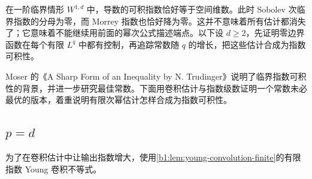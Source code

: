
在一阶临界情形 \(W^{1,d}\) 中，导数的可积指数恰好等于空间维数。此时 Sobolev 次临界指数的分母为零，而 Morrey 指数也恰好降为零。这并不意味着所有估计都消失了；它意味着不能继续用前面的幂次公式描述端点。以下设 \(d\ge2\)，先证明零边界函数在每个有限 \(L^q\) 中都有控制，再追踪常数随 \(q\) 的增长，把这些估计合成为指数可积性。

\ProseParagraphBreak

Moser 的《A Sharp Form of an Inequality by N. Trudinger》\cite[1. Statements, p. 1077]{Moser1971Trudinger}说明了临界指数可积性的背景，并进一步研究最佳常数。下面用卷积估计与指数级数证明一个常数未必最优的版本，着重说明有限次幂估计怎样合成为指数可积性。

\subsection{\texorpdfstring{\(p=d\)}{p=d}}
\label{b1:subsec:240501}

为了在卷积估计中让输出指数增大，使用\cref{b1:lem:young-convolution-finite}的有限指数 Young 卷积不等式。

